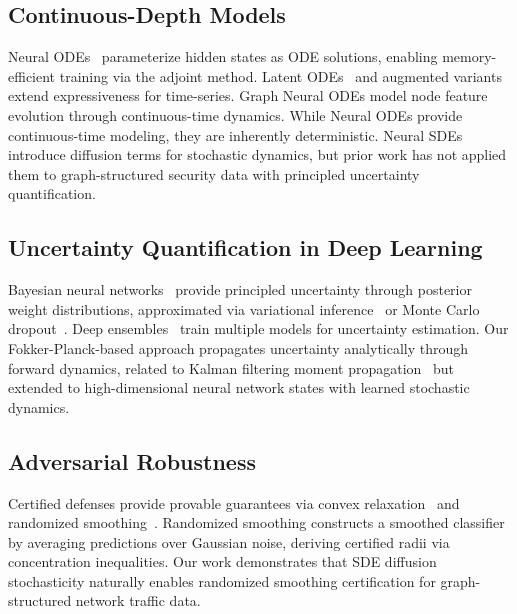 \documentclass[10pt,journal,compsoc]{IEEEtran}
\begin{document}
\vspace{-0.2cm}
\subsection{Continuous-Depth Models}

Neural ODEs~\cite{chen2018neural} parameterize hidden states as ODE solutions, enabling memory-efficient training via the adjoint method. Latent ODEs~\cite{rubanova2019latent} and augmented variants~\cite{dupont2019augmented} extend expressiveness for time-series. Graph Neural ODEs model node feature evolution through continuous-time dynamics. While Neural ODEs provide continuous-time modeling, they are inherently deterministic. Neural SDEs~\cite{li2020scalable} introduce diffusion terms for stochastic dynamics, but prior work has not applied them to graph-structured security data with principled uncertainty quantification.

\vspace{-0.2cm}
\subsection{Uncertainty Quantification in Deep Learning}

Bayesian neural networks~\cite{mackay1992bayesian} provide principled uncertainty through posterior weight distributions, approximated via variational inference~\cite{kingma2014auto} or Monte Carlo dropout~\cite{gal2016dropout}. Deep ensembles~\cite{lakshminarayanan2017simple} train multiple models for uncertainty estimation. Our Fokker-Planck-based approach propagates uncertainty analytically through forward dynamics, related to Kalman filtering moment propagation~\cite{sarkka2013bayesian} but extended to high-dimensional neural network states with learned stochastic dynamics.

\vspace{-0.2cm}
\subsection{Adversarial Robustness}

Certified defenses provide provable guarantees via convex relaxation~\cite{wong2018provable} and randomized smoothing~\cite{cohen2019certified}. Randomized smoothing constructs a smoothed classifier by averaging predictions over Gaussian noise, deriving certified radii via concentration inequalities. Our work demonstrates that SDE diffusion stochasticity naturally enables randomized smoothing certification for graph-structured network traffic data.
\end{document}
